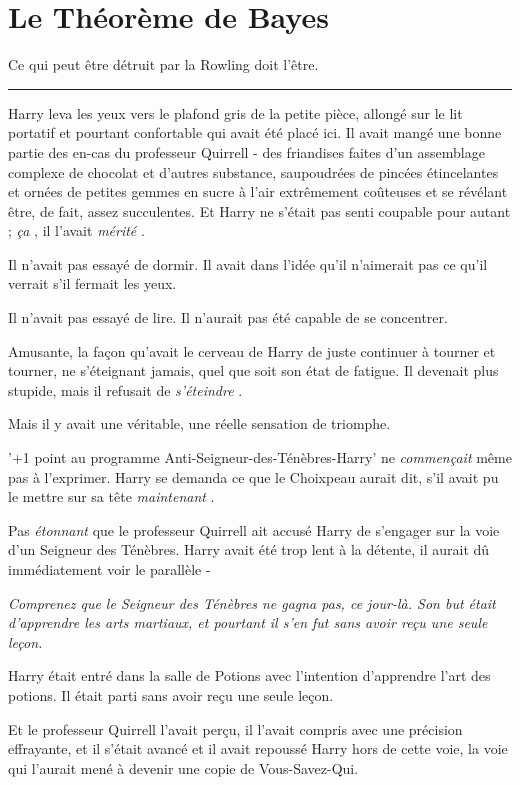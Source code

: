 
\chapter{Le Théorème de Bayes}

Ce qui peut être détruit par la Rowling doit l'être.
\par\noindent\rule{\textwidth}{0.4pt}
Harry leva les yeux vers le plafond gris de la petite pièce, allongé sur le lit portatif et pourtant confortable qui avait été placé ici. Il avait mangé une bonne partie des en-cas du professeur Quirrell - des friandises faites d'un assemblage complexe de chocolat et d'autres substance, saupoudrées de pincées étincelantes et ornées de petites gemmes en sucre à l'air extrêmement coûteuses et se révélant être, de fait, assez succulentes. Et Harry ne s'était pas senti coupable pour autant ; \emph{ça} , il l'avait \emph{mérité} .

Il n'avait pas essayé de dormir. Il avait dans l'idée qu'il n'aimerait pas ce qu'il verrait s'il fermait les yeux.

Il n'avait pas essayé de lire. Il n'aurait pas été capable de se concentrer.

Amusante, la façon qu'avait le cerveau de Harry de juste continuer à tourner et tourner, ne s'éteignant jamais, quel que soit son état de fatigue. Il devenait plus stupide, mais il refusait de \emph{s'éteindre} .

Mais il y avait une véritable, une réelle sensation de triomphe.

'+1 point au programme Anti-Seigneur-des-Ténèbres-Harry' ne \emph{commençait}  même pas à l'exprimer. Harry se demanda ce que le Choixpeau aurait dit, s'il avait pu le mettre sur sa tête \emph{maintenant} .

Pas \emph{étonnant}  que le professeur Quirrell ait accusé Harry de s'engager sur la voie d'un Seigneur des Ténèbres. Harry avait été trop lent à la détente, il aurait dû immédiatement voir le parallèle -

\emph{Comprenez que le Seigneur des Ténèbres ne gagna pas, ce jour-là. Son but était d'apprendre les arts martiaux, et pourtant il s'en fut sans avoir reçu une seule leçon.} 

Harry était entré dans la salle de Potions avec l'intention d'apprendre l'art des potions. Il était parti sans avoir reçu une seule leçon.

Et le professeur Quirrell l'avait perçu, il l'avait compris avec une précision effrayante, et il s'était avancé et il avait repoussé Harry hors de cette voie, la voie qui l'aurait mené à devenir une copie de Vous-Savez-Qui.

